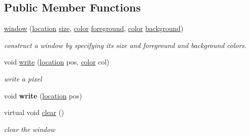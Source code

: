 \subsection*{Public Member Functions}
\begin{DoxyCompactItemize}
\item 
\hyperlink{classhwlib_1_1window_a5acfb1afba5adade79ae1576831128f1}{window} (\hyperlink{classhwlib_1_1location}{location} \hyperlink{classhwlib_1_1window_ad2ad5281c9c09d18010b19cb807d3eaa}{size}, \hyperlink{classhwlib_1_1color}{color} \hyperlink{classhwlib_1_1window_a812e3bf440309bf3280d34fa04eeb718}{foreground}, \hyperlink{classhwlib_1_1color}{color} \hyperlink{classhwlib_1_1window_a1ca47e79ec54ea8b2f38b41b42593d2d}{background})\hypertarget{classhwlib_1_1window_a5acfb1afba5adade79ae1576831128f1}{}\label{classhwlib_1_1window_a5acfb1afba5adade79ae1576831128f1}

\begin{DoxyCompactList}\small\item\em construct a window by specifying its size and foreground and background colors. \end{DoxyCompactList}\item 
void \hyperlink{classhwlib_1_1window_a65122042afeb55e41e5c03b5c8e26fff}{write} (\hyperlink{classhwlib_1_1location}{location} pos, \hyperlink{classhwlib_1_1color}{color} col)
\begin{DoxyCompactList}\small\item\em write a pixel \end{DoxyCompactList}\item 
void {\bfseries write} (\hyperlink{classhwlib_1_1location}{location} pos)\hypertarget{classhwlib_1_1window_ac90b74315df62b9952ce2ee3af95825b}{}\label{classhwlib_1_1window_ac90b74315df62b9952ce2ee3af95825b}

\item 
virtual void \hyperlink{classhwlib_1_1window_a5e781163353ce26cb4dc5b2cbe40ad05}{clear} ()
\begin{DoxyCompactList}\small\item\em clear the window \end{DoxyCompactList}\end{DoxyCompactItemize}
